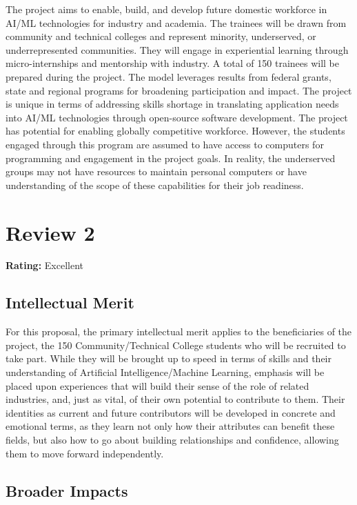 The project aims to enable, build, and develop future domestic workforce in AI/ML technologies for industry and academia. The trainees will be drawn from community and technical colleges and represent minority, underserved, or underrepresented communities. They will engage in experiential learning through micro-internships and mentorship with industry. A total of 150 trainees will be prepared during the project. The model leverages results from federal grants, state and regional programs for broadening participation and impact. The project is unique in terms of addressing skills shortage in translating application needs into AI/ML technologies through open-source software development. The project has potential for enabling globally competitive workforce. However, the students engaged through this program are assumed to have access to computers for programming and engagement in the project goals. In reality, the underserved groups may not have resources to maintain personal computers or have understanding of the scope of these capabilities for their job readiness.

\newpage
\section{Review 2}
\textbf{Rating:} Excellent

\subsection{Intellectual Merit}

For this proposal, the primary intellectual merit applies to the beneficiaries of the project, the 150 Community/Technical College students who will be recruited to take part. While they will be brought up to speed in terms of skills and their understanding of Artificial Intelligence/Machine Learning, emphasis will be placed upon experiences that will build their sense of the role of related industries, and, just as vital, of their own potential to contribute to them. Their identities as current and future contributors will be developed in concrete and emotional terms, as they learn not only how their attributes can benefit these fields, but also how to go about building relationships and confidence, allowing them to move forward independently. 

\subsection{Broader Impacts}

